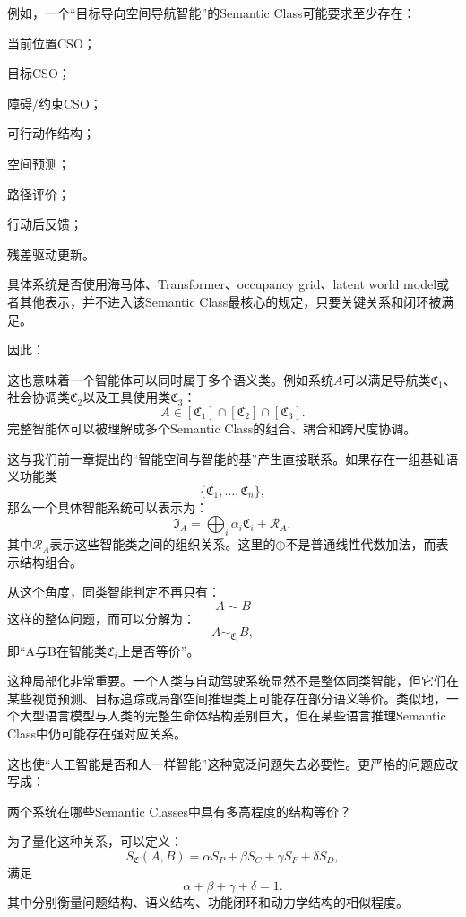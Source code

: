 例如，一个``目标导向空间导航智能''的Semantic Class可能要求至少存在：

当前位置CSO；

目标CSO；

障碍/约束CSO；

可行动作结构；

空间预测；

路径评价；

行动后反馈；

残差驱动更新。

具体系统是否使用海马体、Transformer、occupancy grid、latent world model或者其他表示，并不进入该Semantic Class最核心的规定，只要关键关系和闭环被满足。

因此：
\begin{statementbox}
\centering
{}
\end{statementbox}

这也意味着一个智能体可以同时属于多个语义类。例如系统$A$可以满足导航类$\mathfrak C_1$、社会协调类$\mathfrak C_2$以及工具使用类$\mathfrak C_3$：
\[
A
\in
[\mathfrak C_1]
\cap
[\mathfrak C_2]
\cap
[\mathfrak C_3].
\]
完整智能体可以被理解成多个Semantic Class的组合、耦合和跨尺度协调。

这与我们前一章提出的``智能空间与智能的基''产生直接联系。如果存在一组基础语义功能类
\[
\{\mathfrak C_1,\dots,\mathfrak C_n\},
\]
那么一个具体智能系统可以表示为：
\[
\mathfrak I_A
=
\bigoplus_i
\alpha_i\mathfrak C_i
+
\mathcal R_A,
\]
其中$\mathcal R_A$表示这些智能类之间的组织关系。这里的$\oplus$不是普通线性代数加法，而表示结构组合。

从这个角度，同类智能判定不再只有：
\[
A\sim B
\]
这样的整体问题，而可以分解为：
\[
A\sim_{\mathfrak C_i}B,
\]
即``A与B在智能类$\mathfrak C_i$上是否等价''。

这种局部化非常重要。一个人类与自动驾驶系统显然不是整体同类智能，但它们在某些视觉预测、目标追踪或局部空间推理类上可能存在部分语义等价。类似地，一个大型语言模型与人类的完整生命体结构差别巨大，但在某些语言推理Semantic Class中仍可能存在强对应关系。

这也使``人工智能是否和人一样智能''这种宽泛问题失去必要性。更严格的问题应改写成：
\begin{statementbox}
两个系统在哪些Semantic Classes中具有多高程度的结构等价？
\end{statementbox}

为了量化这种关系，可以定义：
\[
S_{\mathfrak C}(A,B)
=
\alpha S_P
+
\beta S_C
+
\gamma S_F
+
\delta S_D,
\]
满足
\[
\alpha+\beta+\gamma+\delta=1.
\]
其中分别衡量问题结构、语义结构、功能闭环和动力学结构的相似程度。

